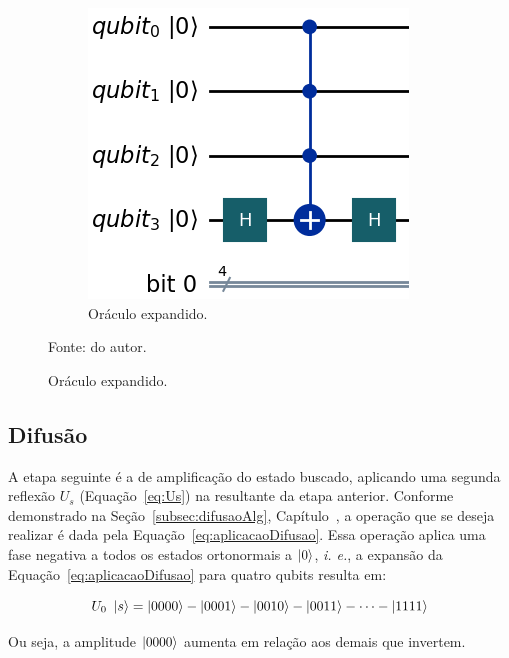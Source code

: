 \begin{figure}[!htb]
\begin{subfigure}[b]{0.25\textwidth}
        \includegraphics[width=\textwidth]{Imagens/oraculoExpandido.png}
        \caption{Oráculo expandido.}
        \label{subfig: oraculoExpandido}
    \end{subfigure}

    \vspace{0.3em}
    {\small Fonte: do autor.}
\end{figure}
%
\subsection{Difus\~{a}o}
\label{subSec: difusaoTeo}

A etapa seguinte é a de amplificação do estado buscado, aplicando uma segunda reflexão $U_s$ (Equaç\~{a}o~\ref{eq:Us}) na resultante da etapa anterior. Conforme demonstrado na Seção~\ref{subsec:difusaoAlg}, Capítulo~, a operação que se deseja realizar é dada pela Equação~\ref{eq:aplicacaoDifusao}. Essa operação aplica uma fase negativa a todos os estados ortonormais a $\ket{0}$, \emph{i. e.}, a expansão da Equação~\ref{eq:aplicacaoDifusao} para quatro qubits resulta em:

\begin{equation}
U_0~\ket{s} = \ket{0000} - \ket{0001} - \ket{0010} - \ket{0011} - \cdots - \ket{1111} 
\end{equation}

Ou seja, a amplitude $\ket{0000}$ aumenta em relação aos demais que invertem.

